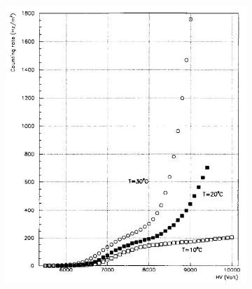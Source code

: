	\begin{figure}
		\begin{subfigure}{\linewidth}
			\centering
			\includegraphics[width = \linewidth]{fig/chapt3/Rate-temperature.png}\\
			\caption{\label{fig:TCorr:A}}
		\end{subfigure}
		\begin{subfigure}{\linewidth}
		    \centering

\end{subfigure}
\end{figure}

